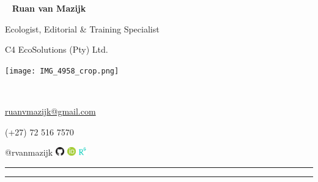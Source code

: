 \begin{multicols}{3}
  \
  \vfill
  \raggedleft
    {\huge \textbf{Ruan van Mazijk}} \par
    {\small Ecologist, Editorial \& Training Specialist} \par
    C4 EcoSolutions (Pty) Ltd.
  \vfill
  \
  \begin{center}
    \texttt{[image: IMG\_4958\_crop.png]}
  \end{center}
  \columnbreak
  \par \
  \vfill
  \raggedright
    {\small \href{mailto:ruanvmazijk@gmail.com}{ruanvmazijk@gmail.com}} \par
    {\small (+27) 72 516 7570} \par
    {\small @rvanmazijk}
      \href{https://github.com/rvanmazijk}
           {\includegraphics[width=1em]{logos/GitHub.png}}
      \href{https://orcid.org/0000-0003-2659-6909}
           {\includegraphics[width=1em]{logos/ORCID.png}}
      \href{https://www.researchgate.net/profile/Ruan-Van-Mazijk}
           {\includegraphics[width=1em]{logos/ResearchGate-white_crop.jpg}}
  \vfill
\end{multicols}

\hrule \vskip2pt \hrule
